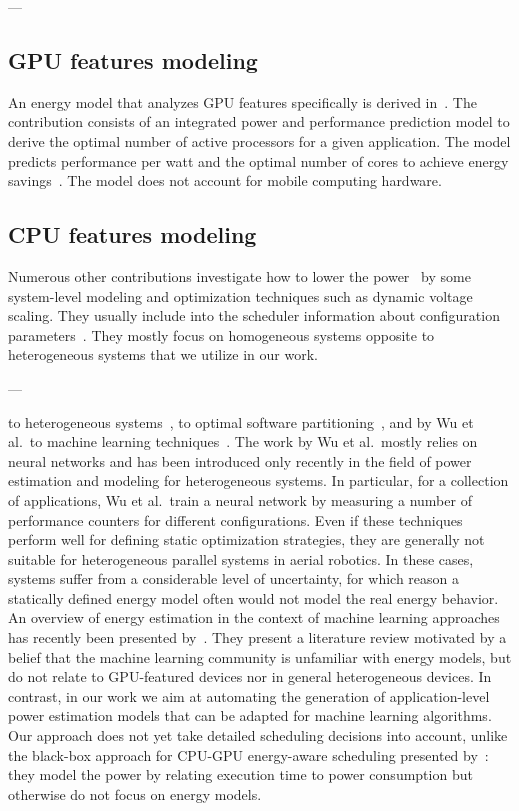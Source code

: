 ---


\subsection{GPU features modeling}

An energy model that analyzes GPU features specifically is derived in~\citep{hong2010integrated}. The contribution consists of an integrated power and performance prediction model to derive the optimal number of active processors for a given application. The model predicts performance per watt and the optimal number of cores to achieve energy savings~\citep{hong2010integrated}. The model does not account for mobile computing hardware.

\subsection{CPU features modeling}
\label{sec:soa-cpu}

Numerous other contributions investigate how to lower the power~\citep{hong1999power, luo2001battery, chowdhury2005static} by some system-level modeling and optimization techniques such as dynamic voltage scaling. They usually include into the scheduler information about configuration parameters~\citep{seewald2019coarse}. They mostly focus on homogeneous systems opposite to heterogeneous systems that we utilize in our work. 


---







to heterogeneous systems~\citep{bailey2014adaptive}, to optimal software partitioning~\citep{goraczko2008energy}, and by Wu et al.\ to machine learning techniques~\citep{wu2015gpgpu}. The work by Wu et al.\ mostly relies on neural networks and has been introduced only recently in the field of power estimation and modeling for heterogeneous systems. In particular, for a collection of applications, Wu et al.\ train a neural network by measuring a number of performance counters for different configurations. Even if these techniques perform well for defining static optimization strategies, they are generally not suitable for heterogeneous parallel systems in aerial robotics. In these cases, systems suffer from a considerable level of uncertainty, for which reason a statically defined energy model often would not model the real energy behavior. An overview of energy estimation in the context of machine learning approaches has recently been presented by~\citep{garcia2019estimation}. They present a literature review motivated by a belief that the machine learning community is unfamiliar with energy models, but do not relate to GPU-featured devices nor in general heterogeneous devices. In contrast, in our work we aim at automating the generation of application-level power estimation models that can be adapted for machine learning algorithms. Our approach does not yet take detailed scheduling decisions into account, unlike the black-box approach for CPU-GPU energy-aware scheduling presented by~\citep{barik2016black}: they model the power by relating execution time to power consumption but otherwise do not focus on energy models.
 



